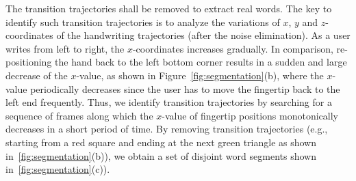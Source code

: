 
 
The transition trajectories shall be removed to extract real words. The key to identify such transition trajectories is to analyze the variations of $x$, $y$ and $z$-coordinates of
the handwriting trajectories (after the noise elimination). As a user writes from  left to right, the $x$-coordinates increases gradually. In comparison, re-positioning the hand back to the left bottom corner results in a sudden and large decrease of the $x$-value, as shown in Figure~\ref{fig:segmentation}(b), 
where the $x$-value periodically decreases since the user has to move the fingertip back to the left end frequently.
Thus, we identify transition trajectories by searching for a sequence of frames along which the $x$-value of fingertip positions monotonically decreases in a short period of time. By removing transition trajectories (e.g., starting from a red square and ending at the next green triangle as shown in~\ref{fig:segmentation}(b)), 
we obtain a set of disjoint word segments shown in~\ref{fig:segmentation}(c)). 




